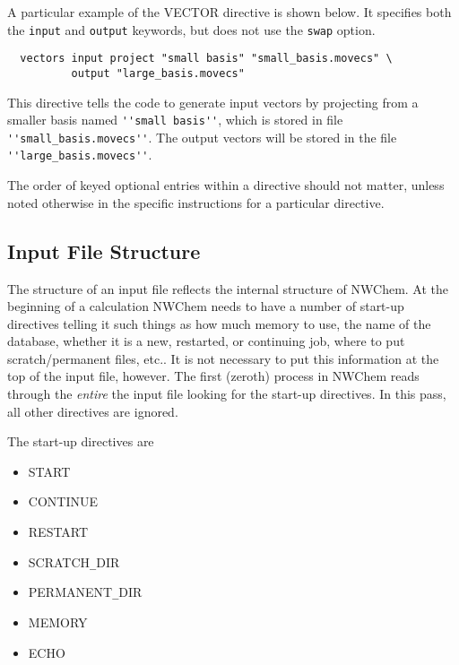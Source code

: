 A particular example of the VECTOR directive is shown below.  It specifies
both the \verb+input+ and \verb+output+ keywords, but does not use the 
\verb+swap+ option.

\begin{verbatim}
  vectors input project "small basis" "small_basis.movecs" \
          output "large_basis.movecs"
\end{verbatim}

This directive tells the code to generate input vectors by projecting from a 
smaller basis named \verb+''small basis''+, which is stored in file 
\verb+''small_basis.movecs''+.  The output vectors will be stored in the file
 \verb+''large_basis.movecs''+.

The order of keyed optional entries within a directive should not matter,
unless noted otherwise in the specific instructions for a particular directive.


\subsection{Input File Structure}
\label{sec:inputstructure}

The structure of an input file reflects the internal structure of
NWChem.  At the beginning of a calculation NWChem needs to have a number
of start-up directives telling it such things as how much memory to use, 
the name of the database, whether it is a new, restarted, or continuing job, 
where to put scratch/permanent files, etc..  It is not necessary to put
this information at the top of the input file, however.  The first (zeroth)
process in NWChem reads through the {\em entire} the input file looking for 
the start-up directives.  In this pass, all other directives are ignored.  

The start-up directives are

\begin{itemize}
\item START
\item CONTINUE
\item RESTART
\item SCRATCH{\verb+_+}DIR
\item PERMANENT{\verb+_+}DIR
\item MEMORY
\item ECHO


\end{itemize}

